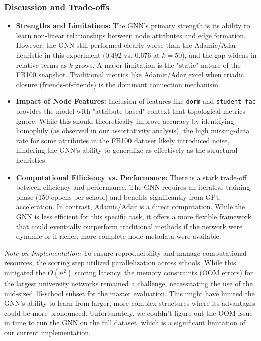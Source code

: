 \documentclass[12pt]{article}
\begin{document}
\subsubsection*{Discussion and Trade-offs}

\begin{itemize}
    \item \textbf{Strengths and Limitations:} The GNN's primary strength is its ability to learn non-linear relationships between node attributes and edge formation. However, the GNN still performed clearly worse than the Adamic/Adar heuristic in this experiment (0.492 vs. 0.676 at $k=50$), and the gap widens in relative terms as $k$ grows. A major limitation is the "static" nature of the FB100 snapshot. Traditional metrics like Adamic/Adar excel when triadic closure (friends-of-friends) is the dominant connection mechanism.

    \item \textbf{Impact of Node Features:} Inclusion of features like \texttt{dorm} and \texttt{student\_fac} provides the model with "attribute-based" context that topological metrics ignore. While this should theoretically improve accuracy by identifying homophily (as observed in our assortativity analysis), the high missing-data rate for some attributes in the FB100 dataset likely introduced noise, hindering the GNN's ability to generalize as effectively as the structural heuristics.

    \item \textbf{Computational Efficiency vs. Performance:} There is a stark trade-off between efficiency and performance. The GNN requires an iterative training phase (150 epochs per school) and benefits significantly from GPU acceleration. In contrast, Adamic/Adar is a direct computation. While the GNN is less efficient for this specific task, it offers a more flexible framework that could eventually outperform traditional methods if the network were dynamic or if richer, more complete node metadata were available.
\end{itemize}

\textit{Note on Implementation:} To ensure reproducibility and manage computational resources, the scoring step utilized parallelization across schools. While this mitigated the $O(n^2)$ scoring latency, the memory constraints (OOM errors) for the largest university networks remained a challenge, necessitating the use of the mid-sized 15-school subset for the master evaluation. This might have limited the GNN's ability to learn from larger, more complex structures where its advantages could be more pronounced. Unfortunately, we couldn't figure out the OOM issue in time to run the GNN on the full dataset, which is a significant limitation of our current implementation.
\end{document}
